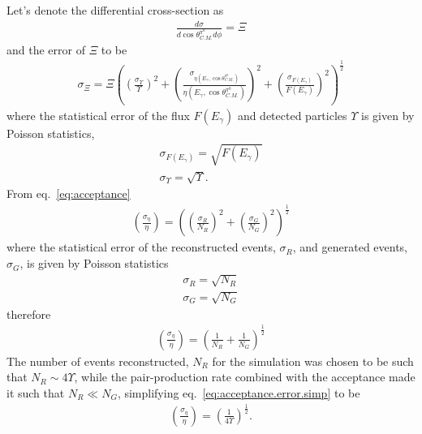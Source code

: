 Let's denote the differential cross-section as 
\begin{align}
\frac{d\sigma}{d\cos\theta^{\pi^0}_{C.M.} d\phi} = \varXi \nonumber
\end{align}
and the error of $\varXi$ to be
\begin{align}
\sigma_\varXi = \varXi \left(\left(\frac{\sigma_{\Upsilon}}{\Upsilon}\right)^2 +\left(\frac{\sigma_{ \eta(E_\gamma,\cos\theta^{\pi^0}_{C.M.})}}{\eta(E_\gamma,\cos\theta^{\pi^0}_{C.M.})}\right)^2 + \left(\frac{\sigma_{F(E_\gamma)}}{F(E_\gamma)}\right)^2\right)^{\frac{1}{2}}\label{eq:xsection.error}
\end{align}
where the statistical error of the flux $F(E_\gamma)$ and detected particles $\Upsilon$ is given by Poisson statistics,
\begin{subequations}
\begin{align}
\sigma_{F(E_\gamma)} = \sqrt{F(E_\gamma)} \label{eq:flux.err} \\
\sigma_{\Upsilon} = \sqrt{\Upsilon} \label{eq:yield.err}. 
\end{align}
\end{subequations}
From eq.~\ref{eq:acceptance}
\begin{align}\label{eq:acceptance.error}
\left(\frac{\sigma_\eta}{\eta}\right) = \left(\left(\frac{\sigma_R}{N_R}\right)^2 +\left(\frac{\sigma_G}{N_G}\right)^2\right)^{\frac{1}{2}}
\end{align}
where the statistical error of the reconstructed events, $\sigma_R$, and generated events, $\sigma_G$, is given by Poisson statistics
\begin{subequations}
\begin{align}
\sigma_{R} = \sqrt{N_R} \nonumber\\
\sigma_{G} = \sqrt{N_G} \nonumber
\end{align}
\end{subequations}
therefore 
\begin{align}\label{eq:acceptance.error.simp}
\left(\frac{\sigma_\eta}{\eta}\right) = \left(\frac{1}{N_R} +\frac{1}{N_G}\right)^{\frac{1}{2}}
\end{align}
The number of events reconstructed, $N_R$ for the simulation was chosen to be such that $N_R \sim 4\Upsilon$, while the pair-production rate combined with the acceptance made it such that $N_R \ll N_G$, simplifying eq.~\ref{eq:acceptance.error.simp} to be
\begin{align}\label{eq:acceptance.error.simpII}
\left(\frac{\sigma_\eta}{\eta}\right) = \left(\frac{1}{4\Upsilon}\right)^{\frac{1}{2}}.
\end{align}
